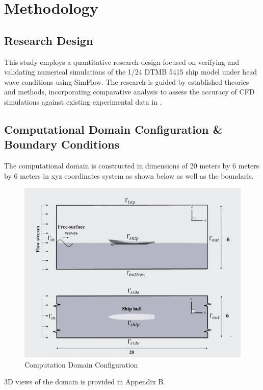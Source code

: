 \documentclass[12pt]{article} %
\begin{document}


\newpage
\section{Methodology}

\subsection{Research Design}
This study employs a quantitative research design focused on verifying and validating numerical 
simulations of the 1/24 DTMB 5415 ship model under head wave conditions using SimFlow. The research 
is guided by established theories and methods, incorporating comparative analysis to assess the 
accuracy of CFD simulations against existing experimental data in \cite{Begovic2017}.

\subsection{Computational Domain Configuration \& Boundary Conditions}

The computational domain is constructed in dimensions of 20 meters by 6 meters by 6 meters in xyz coordinates 
system as shown below as well as the boundaris.
\begin{figure}[ht]
    \centering
    \includegraphics[width=1\textwidth]{Domain.jpg}
    \caption{Computation Domain Configuration}
\end{figure}
3D views of the domain is provided in Appendix B.
\end{document}
